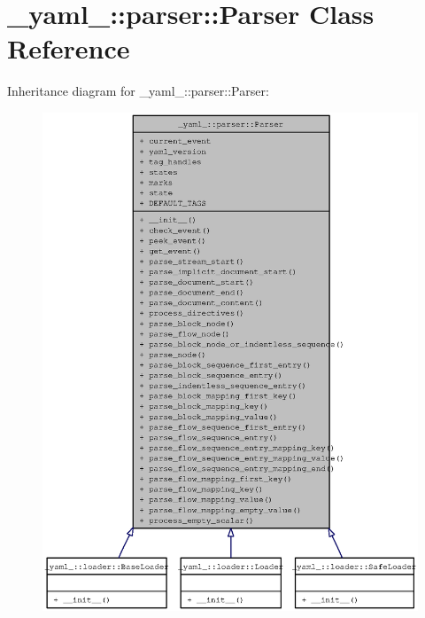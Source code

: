 \section{\_\-yaml\_\-::parser::Parser Class Reference}
\label{class__yaml___1_1parser_1_1Parser}
Inheritance diagram for \_\-yaml\_\-::parser::Parser:\nopagebreak
\begin{figure}[H]
\begin{center}
\leavevmode
\includegraphics[width=400pt]{class__yaml___1_1parser_1_1Parser__inherit__graph}
\end{center}
\end{figure}
